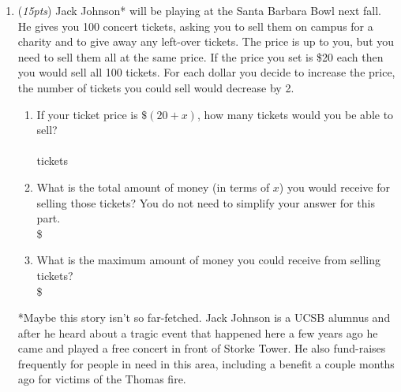 \documentclass[12pt]{article}
\newcommand{\ansbox}[2]{\raisebox{-.5\height}{\framebox(#1,#2){}}}
\begin{document}
\begin{enumerate}
	
	
    
    
\newpage
\item ({\it 15pts}) Jack Johnson* will be playing at the Santa Barbara Bowl next fall. He gives you 100 concert tickets, asking you to sell them on campus for a charity and to give away any left-over tickets. The price is up to you, but you need to sell them all at the same price. If the price you set is \$20 each then you would sell all 100 tickets. For each dollar you decide to increase the price, the number of tickets you could sell would decrease by 2. 
\begin{enumerate}
\item If your ticket price is
$\$(20 + x)$, how many tickets would you be able to sell? \\ 
\vspace{30pt} \\
\phantom{.} \hfill  \ansbox{150}{50} tickets
\item What is the total amount of
money (in terms of $x$) you would receive for selling those tickets? You do not need to simplify your answer for this part. \\ 
\vfill
\phantom{.} \hfill {\Large \$} \ \ansbox{350}{50} 
\item What is the maximum amount of money you could receive from selling tickets? \\ 
\vfill
\vfill
\vfill
\phantom{.} \hfill {\Large \$} \ \ansbox{80}{50} 
\end{enumerate}
\scriptsize{*Maybe this story isn't so far-fetched. Jack Johnson is a UCSB alumnus and after he heard about a tragic event that happened here a few years ago he came and played a free concert in front of Storke Tower. He also fund-raises frequently for people in need in this area, including a benefit a couple months ago for victims of the Thomas fire.} 















\end{enumerate}
\end{document}
